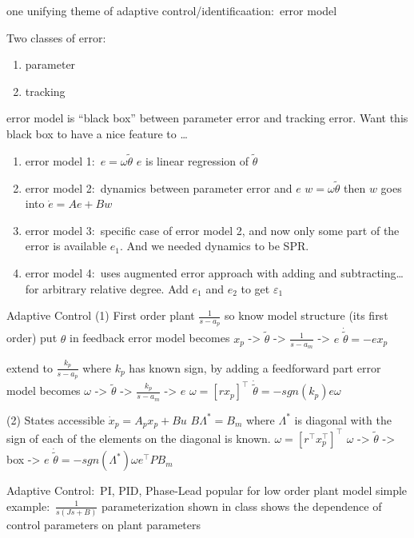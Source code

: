 one unifying theme of adaptive control/identificaation:\ error model

Two classes of error:
\begin{enumerate}
  \setlength{\itemsep}{0pt}
  \item{parameter}
  \item{tracking}
\end{enumerate}

error model is ``black box'' between parameter error and tracking error.
Want this black box to have a nice feature to \ldots

\begin{enumerate}
  \setlength{\itemsep}{0pt}
  \item{error model 1:\ $e=\omega\tilde{\theta}$ $e$ is linear regression of $\tilde{\theta}$}
  \item{error model 2:\ dynamics between parameter error and $e$ $w=\omega\tilde{\theta}$ then $w$ goes into $\dot{e}=Ae+Bw$}
  \item{%
    error model 3:\ specific case of error model 2, and now only some part of the error is available $e_{1}$.
    And we needed dynamics to be SPR.\@
  }
  \item{error model 4:\ uses augmented error approach with adding and subtracting\ldots
  for arbitrary relative degree.
  Add $e_{1}$ and $e_{2}$ to get $\varepsilon_{1}$}
\end{enumerate}

Adaptive Control
(1) First order plant
$\frac{1}{s-a_{p}}$
so know model structure (its first order)
put $\theta$ in feedback
error model becomes $x_{p}$ -> $\tilde{\theta}$ -> $\frac{1}{s-a_{m}}$ -> $e$
$\dot{\tilde{\theta}}=-ex_{p}$

extend to $\frac{k_{p}}{s-a_{p}}$ where $k_{p}$ has known sign, by adding a feedforward part
error model becomes $\omega$ -> $\tilde{\theta}$ -> $\frac{k_{p}}{s-a_{m}}$ -> $e$
$\omega=[r x_{p}]^{\top}$
$\dot{\tilde{\theta}}=-sgn(k_{p})e\omega$

(2) States accessible
$\dot{x}_{p}=A_{p}x_{p}+Bu$
$B\Lambda^{*}=B_{m}$ where $\Lambda^{*}$ is diagonal with the sign of each of the elements on the diagonal is known.
$\omega=[r^{\top} x_{p}^{\top}]^{\top}$
$\omega$ -> $\tilde{\theta}$ -> box -> $e$
$\dot{\tilde{\theta}}=-sgn(\Lambda^{*})\omega e^{\top}PB_{m}$

Adaptive Control:\ PI, PID, Phase-Lead
popular for low order plant model
simple example:\ $\frac{1}{s(Js+B)}$
parameterization shown in class shows the dependence of control parameters on plant parameters

